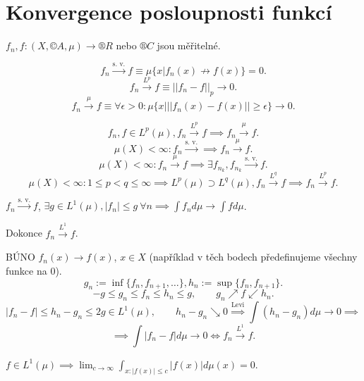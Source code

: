 \documentclass[12pt]{article}					%
\begin{document}
\section{Konvergence posloupnosti funkcí}
\begin{poznamka}
	$f_n, f: (X, ©A, \mu) \rightarrow ®R$ nebo $®C$ jsou měřitelné.

	$$ f_n \overset{\text{s. v.}}{\rightarrow} f ≡ \mu\{x | f_n(x) \not\rightarrow f(x)\} = 0. $$
	$$ f_n \overset{L^p}{\rightarrow} f ≡ ||f_n - f||_p \rightarrow 0. $$
	$$ f_n \overset{\mu}{\rightarrow} f ≡ \forall \epsilon > 0: \mu\{x | ||f_n(x) - f(x)|| ≥ \epsilon\} \rightarrow 0. $$

	\begin{tvrzeniin}
		$$ f_n, f \in L^p(\mu), f_n \overset{L^p}{\rightarrow} f \implies f_n \overset{\mu}{\rightarrow} f. $$
		$$ \mu(X) < ∞: f_n \overset{\text{s. v.}}{\rightarrow} \implies f_n \overset{\mu}{\rightarrow} f. $$
		$$ \mu(X) < ∞: f_n \overset{\mu}{\rightarrow} f \implies \exists f_{n_k}, f_{n_k} \overset{\text{s. v.}}{\rightarrow} f. $$
		$$ \mu(X) < ∞: 1 ≤ p < q ≤ ∞ \implies L^p(\mu) \supset L^q(\mu), f_n \overset{L^q}{\rightarrow} f \implies f_n \overset{L^p}{\rightarrow} f. $$
	\end{tvrzeniin}
\end{poznamka}

\begin{veta}
	$f_n \overset{\text{s. v.}}{\rightarrow} f$, $\exists g \in L^1(\mu), |f_n| ≤ g\ \forall n \implies \int f_n d\mu \rightarrow \int fd\mu$.

	Dokonce $f_n \overset{L^1}{\rightarrow} f$.

	\begin{dukazin}
		BÚNO $f_n(x) \rightarrow f(x)$, $x \in X$ (například v těch bodech předefinujeme všechny funkce na 0).
		$$ g_n := \inf\{f_n, f_{n+1}, …\}, h_n := \sup\{f_n, f_{n+1}\}. $$
		$$ -g ≤ g_n ≤ f_n ≤ h_n ≤ g, \qquad g_n \nearrow f \swarrow h_n. $$
		$$ |f_n - f| ≤ h_n - g_n ≤ 2g \in L^1(\mu), \qquad h_n - g_n \searrow 0 \overset{\text{Levi}}{\implies} \int(h_n - g_n) d\mu \rightarrow 0 \implies $$
		$$ \implies \int |f_n - f| d\mu \rightarrow 0 \Leftrightarrow f_n \overset{L^1}{\rightarrow} f. $$
	\end{dukazin}
\end{veta}

\begin{poznamka}
	$f \in L^1(\mu) \implies \lim_{c \rightarrow ∞} \int_{x: |f(x)| ≤ c} |f(x)| d\mu(x) = 0$.
\end{poznamka}
\end{document}
